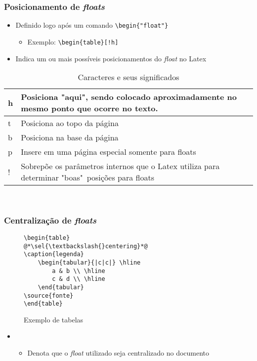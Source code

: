\begin{frame}[fragile] \frametitle{Posicionamento de \textit{floats}}
\begin{itemize}
	\item Definido logo após um comando \texttt{\textbackslash{}begin\{"float"\}}
	\begin{itemize}
		\item Exemplo: \texttt{\textbackslash{}begin\{table\}[!h]}
	\end{itemize}
	\item Indica um ou mais possíveis posicionamentos do \textit{float} no Latex
\end{itemize}

\begin{table}[!t]
\caption{Caracteres e seus significados}
\label{tab:posicaofloats}
\begin{tabular}{l|p{7.5cm}} \hline
h & Posiciona "aqui", sendo colocado aproximadamente no mesmo ponto que ocorre no texto.            \\ \hline
t & Posiciona ao topo da página             \\ \hline
b & Posiciona na base da página             \\ \hline
p & Insere em uma página especial somente para floats     \\ \hline
! & Sobrepõe os parâmetros internos que o Latex utiliza para determinar "boas"~posições para floats \\ \hline
\end{tabular}
\\ \vspace{0.25cm} \ownsrc
\end{table}
\end{frame}

\begin{frame}[fragile,label={slide:floatcentering}] \frametitle{Centralização de \textit{floats}}
\vspace{-0.5cm}
\begin{figure}[!t]
\caption{Exemplo de tabelas}
\begin{lstlisting}
\begin{table}
@*\sel{\textbackslash{}centering}*@
\caption{legenda}
	\begin{tabular}{|c|c|} \hline
		a & b \\ \hline
		c & d \\ \hline
	\end{tabular}
\source{fonte}
\end{table}
\end{lstlisting}
\ownsrc
\end{figure}

\begin{itemize}
	\item {}
	\begin{itemize}
		\item Denota que o \textit{float} utilizado seja centralizado no documento
	\end{itemize}
\end{itemize}
\end{frame}

